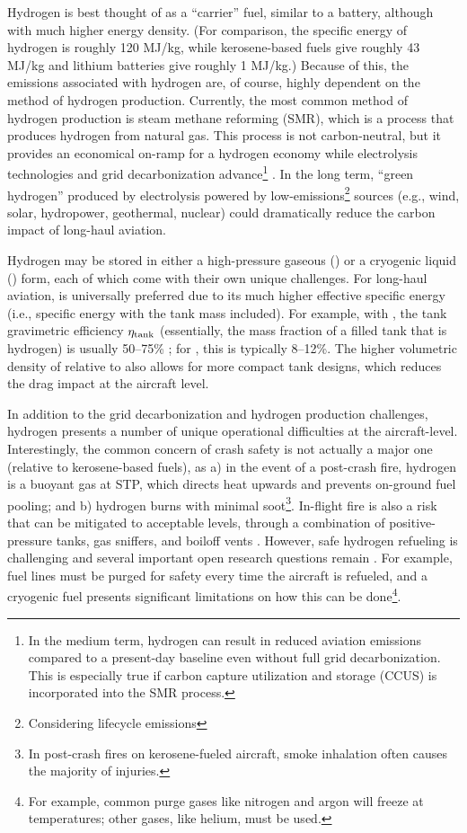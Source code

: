 Hydrogen is best thought of as a ``carrier'' fuel, similar to a battery, although with much higher energy density. (For comparison, the specific energy of hydrogen is roughly 120 MJ/kg, while kerosene-based fuels give roughly 43 MJ/kg and lithium batteries give roughly 1 MJ/kg.) Because of this, the emissions associated with hydrogen are, of course, highly dependent on the method of hydrogen production. Currently, the most common method of hydrogen production is steam methane reforming (SMR), which is a process that produces hydrogen from natural gas. This process is not carbon-neutral, but it provides an economical on-ramp for a hydrogen economy while electrolysis technologies and grid decarbonization advance\footnote{In the medium term, hydrogen can result in reduced aviation emissions compared to a present-day baseline even without full grid decarbonization. This is especially true if carbon capture utilization and storage (CCUS) is incorporated into the SMR process.} \cite{cascade}. In the long term, ``green hydrogen'' produced by electrolysis powered by low-emissions\footnote{Considering lifecycle emissions} sources (e.g., wind, solar, hydropower, geothermal, nuclear) could dramatically reduce the carbon impact of long-haul aviation.

Hydrogen may be stored in either a high-pressure gaseous (\gh) or a cryogenic liquid (\lh) form, each of which come with their own unique challenges. For long-haul aviation, \lh is universally preferred due to its much higher effective specific energy (i.e., specific energy with the tank mass included). For example, with \lh, the tank gravimetric efficiency $\eta_{\rm tank}$ (essentially, the mass fraction of a filled tank that is hydrogen) is usually 50--75\% \cite{brewer_hydrogen_1991}; for \gh, this is typically 8--12\%. The higher volumetric density of \lh relative to \gh also allows for more compact tank designs, which reduces the drag impact at the aircraft level.

In addition to the grid decarbonization and hydrogen production challenges, hydrogen presents a number of unique operational difficulties at the aircraft-level. Interestingly, the common concern of crash safety is not actually a major one (relative to kerosene-based fuels), as a) in the event of a post-crash fire, hydrogen is a buoyant gas at STP, which directs heat upwards and prevents on-ground fuel pooling; and b) hydrogen burns with minimal soot\footnote{In post-crash fires on kerosene-fueled aircraft, smoke inhalation often causes the majority of injuries.}. In-flight fire is also a risk that can be mitigated to acceptable levels, through a combination of positive-pressure tanks, gas sniffers, and boiloff vents \cite{brewer_hydrogen_1991}. However, safe hydrogen refueling is challenging and several important open research questions remain \cite{gaubatz_estimating_2023}. For example, fuel lines must be purged for safety every time the aircraft is refueled, and a cryogenic fuel presents significant limitations on how this can be done\footnote{For example, common purge gases like nitrogen and argon will freeze at \lh temperatures; other gases, like helium, must be used.}.

